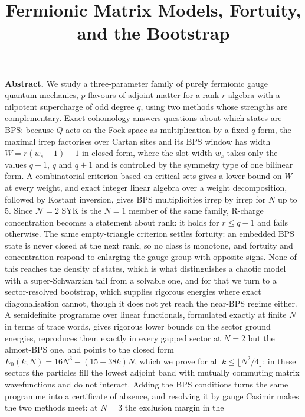 \documentclass[10pt]{article}
\title{\vspace{-1.5cm}\Large\textbf{Fermionic Matrix Models, Fortuity, and the Bootstrap}\vspace{-6pt}}
\author{}
\date{}
\begin{document}
\maketitle
\vspace{-1.0cm}
\begin{center}\begin{minipage}{0.95\textwidth}\small
\textbf{Abstract.} We study a three-parameter family of purely fermionic gauge quantum mechanics, $p$ flavours of
adjoint matter for a rank-$r$ algebra with a nilpotent supercharge of odd degree $q$, using two methods whose
strengths are complementary. Exact cohomology answers questions about which states are BPS: because $Q$ acts on
the Fock space as multiplication by a fixed $q$-form, the maximal irrep factorises over Cartan sites and its BPS
window has width $W=r(w_s-1)+1$ in closed form, where the slot width $w_s$ takes only the values $q-1$, $q$ and
$q+1$ and is controlled by the symmetry type of one bilinear form. A combinatorial criterion based on critical
sets gives a lower bound on $W$ at every weight, and exact integer linear algebra over a weight decomposition,
followed by Kostant inversion, gives BPS multiplicities irrep by irrep for $N$ up to $5$. Since
$\mathcal N=2$ SYK is the $N=1$ member of the same family, R-charge concentration becomes a statement about
rank: it holds for $r\le q-1$ and fails otherwise. The same empty-triangle criterion settles fortuity: an
embedded BPS state is never closed at the next rank, so no class is monotone, and fortuity and concentration
respond to enlarging the gauge group with opposite signs. None of this reaches the density of states, which is
what distinguishes a chaotic model with a super-Schwarzian tail from a solvable one, and for that we turn to a
sector-resolved bootstrap, which supplies rigorous energies where exact diagonalisation cannot, though it does
not yet reach the near-BPS regime either. A semidefinite programme over linear functionals, formulated exactly at finite $N$ in
terms of trace words, gives rigorous lower bounds on the sector ground energies, reproduces them exactly in
every gapped sector at $N=2$ but the almost-BPS one, and points to the closed form $E_0(k;N)=16N^3-(15+38k)N$,
which we prove for all $k\le\lfloor N^2/4\rfloor$: in these sectors the particles fill the lowest adjoint band
with mutually commuting matrix wavefunctions and do not interact. Adding the BPS conditions turns the same programme into a certificate of absence, and
resolving it by gauge Casimir makes the two methods meet: at $N=3$ the exclusion margin in the

\end{minipage}
\end{center}
\end{document}
